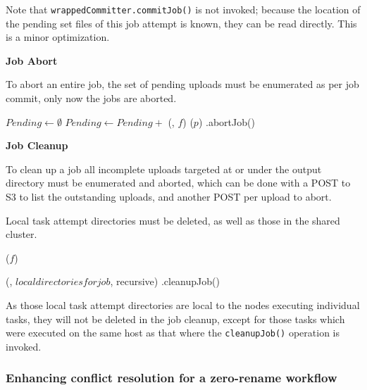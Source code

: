 \documentclass[conference]{IEEEtran}
\begin{document}
Note that \texttt{wrappedCommitter.commitJob()} is not invoked;
because the location of the pending set files of this job attempt is known,
they can be read directly.
This is a minor optimization.


\textbf{Job Abort}

To abort an entire job, the set of pending uploads must be enumerated as
per job commit, only now the jobs are aborted.

\begin{procedure}
\StagingVars

  $Pending \longleftarrow \emptyset$\;
   {
    $Pending \longleftarrow Pending + $ \loadPendingSet(\clusterfs, $f$)\;
  }
   {
    \abortUpload($p$)\;
  }
  \wrappedCommitter.abortJob()\;

\caption{StagingCommitter.abortJob()}
\label{alg:StagingCommitter.abortJob}
\end{procedure}


\textbf{Job Cleanup}

To clean up a job all incomplete uploads targeted at or under
the output directory must be enumerated and aborted, which can be done
with a POST to S3 to list the outstanding uploads, and another POST per
upload to abort.

Local task attempt directories must be deleted, as well as those in the shared cluster.

\begin{procedure}
\StagingVars

   {
    \abortUpload($f$)\;
  }

  \delete(\localfs, $local directories for job$, recursive)\;
  \wrappedCommitter.cleanupJob()\;

\caption{StagingCommitter.cleanupJob()}
\label{alg:StagingCommitter.cleanupJob}
\end{procedure}


As those local task attempt directories are local to the nodes executing
individual tasks, they will not be deleted in the job cleanup, except for
those tasks which were executed on the same host as that where the
\texttt{cleanupJob()} operation is invoked.


\subsubsection{Enhancing conflict resolution for a zero-rename workflow}
\end{document}
